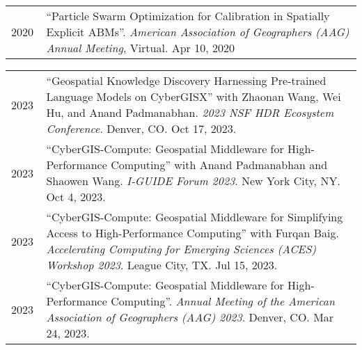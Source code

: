 \documentclass{acmcv}
\begin{document}
\begin{longtable}{p{0.1\linewidth} p{0.9\linewidth}}
        2020 & ``Particle Swarm Optimization for Calibration in Spatially Explicit ABMs''. \textit{American Association of Geographers (AAG) Annual Meeting}, Virtual. Apr 10, 2020 \\




    \end{longtable}
    \vspace*{-0.2cm}
    
    \begin{longtable}{p{0.1\linewidth} p{0.9\linewidth}}
        2023 & ``Geospatial Knowledge Discovery Harnessing Pre-trained Language Models on CyberGISX'' with Zhaonan Wang, Wei Hu, and Anand Padmanabhan. \textit{2023 NSF HDR Ecosystem Conference}. Denver, CO. Oct 17, 2023.\\

        2023 & ``CyberGIS-Compute: Geospatial Middleware for High-Performance Computing'' with Anand Padmanabhan and Shaowen Wang. \textit{I-GUIDE Forum 2023}. New York City, NY. Oct 4, 2023.\\

        2023 & ``CyberGIS-Compute: Geospatial Middleware for Simplifying Access to High-Performance Computing'' with Furqan Baig. \textit{Accelerating Computing for Emerging Sciences (ACES) Workshop 2023}. League City, TX. Jul 15, 2023.\\

        2023 & ``CyberGIS-Compute: Geospatial Middleware for High-Performance Computing''. \textit{Annual Meeting of the American Association of Geographers (AAG) 2023}. Denver, CO. Mar 24, 2023.\\

    \end{longtable}
    \vspace*{0.2cm}
\end{document}
